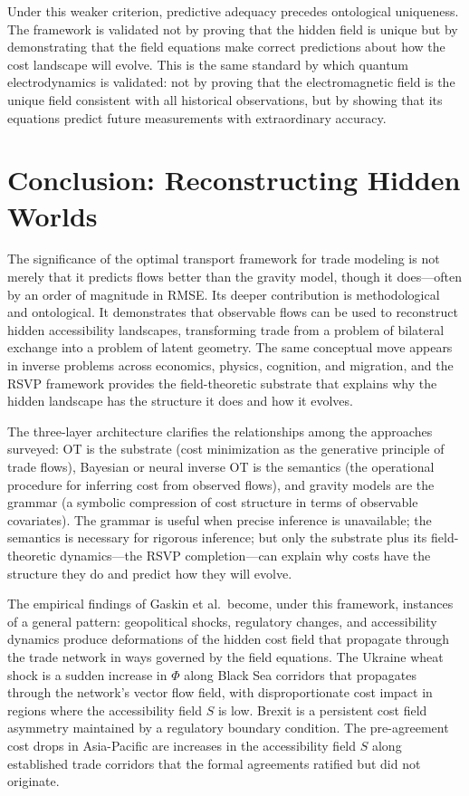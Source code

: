 \documentclass[12pt]{article}
\begin{document}
Under this weaker criterion, predictive adequacy precedes ontological uniqueness. The framework is validated not by proving that the hidden field is unique but by demonstrating that the field equations make correct predictions about how the cost landscape will evolve. This is the same standard by which quantum electrodynamics is validated: not by proving that the electromagnetic field is the unique field consistent with all historical observations, but by showing that its equations predict future measurements with extraordinary accuracy.

\section{Conclusion: Reconstructing Hidden Worlds}

The significance of the optimal transport framework for trade modeling is not merely that it predicts flows better than the gravity model, though it does---often by an order of magnitude in RMSE. Its deeper contribution is methodological and ontological. It demonstrates that observable flows can be used to reconstruct hidden accessibility landscapes, transforming trade from a problem of bilateral exchange into a problem of latent geometry. The same conceptual move appears in inverse problems across economics, physics, cognition, and migration, and the RSVP framework provides the field-theoretic substrate that explains why the hidden landscape has the structure it does and how it evolves.

The three-layer architecture clarifies the relationships among the approaches surveyed: OT is the substrate (cost minimization as the generative principle of trade flows), Bayesian or neural inverse OT is the semantics (the operational procedure for inferring cost from observed flows), and gravity models are the grammar (a symbolic compression of cost structure in terms of observable covariates). The grammar is useful when precise inference is unavailable; the semantics is necessary for rigorous inference; but only the substrate plus its field-theoretic dynamics---the RSVP completion---can explain why costs have the structure they do and predict how they will evolve.

The empirical findings of Gaskin et al.\ become, under this framework, instances of a general pattern: geopolitical shocks, regulatory changes, and accessibility dynamics produce deformations of the hidden cost field that propagate through the trade network in ways governed by the field equations. The Ukraine wheat shock is a sudden increase in $\Phi$ along Black Sea corridors that propagates through the network's vector flow field, with disproportionate cost impact in regions where the accessibility field $S$ is low. Brexit is a persistent cost field asymmetry maintained by a regulatory boundary condition. The pre-agreement cost drops in Asia-Pacific are increases in the accessibility field $S$ along established trade corridors that the formal agreements ratified but did not originate.
\end{document}

